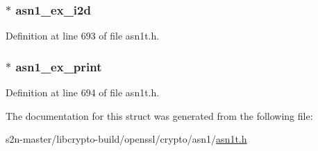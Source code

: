 \subsubsection[{\texorpdfstring{asn1\+\_\+ex\+\_\+i2d}{asn1_ex_i2d}}]{ $\ast$ asn1\+\_\+ex\+\_\+i2d}\hypertarget{struct_a_s_n1___e_x_t_e_r_n___f_u_n_c_s__st_aaf777948f0332fc3495f43d7e0e6cfcd}{}\label{struct_a_s_n1___e_x_t_e_r_n___f_u_n_c_s__st_aaf777948f0332fc3495f43d7e0e6cfcd}


Definition at line 693 of file asn1t.\+h.

\subsubsection[{\texorpdfstring{asn1\+\_\+ex\+\_\+print}{asn1_ex_print}}]{ $\ast$ asn1\+\_\+ex\+\_\+print}\hypertarget{struct_a_s_n1___e_x_t_e_r_n___f_u_n_c_s__st_a6706b8c2bdb20edf184116dff6f15ecb}{}\label{struct_a_s_n1___e_x_t_e_r_n___f_u_n_c_s__st_a6706b8c2bdb20edf184116dff6f15ecb}


Definition at line 694 of file asn1t.\+h.



The documentation for this struct was generated from the following file\+:\begin{DoxyCompactItemize}
\item 
s2n-\/master/libcrypto-\/build/openssl/crypto/asn1/\hyperlink{crypto_2asn1_2asn1t_8h}{asn1t.\+h}\end{DoxyCompactItemize}

